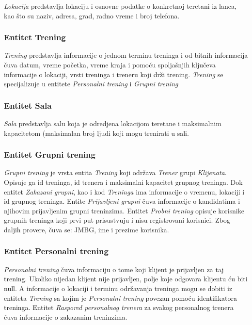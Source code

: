 \documentclass[../main.tex]{subfiles}
\begin{document}
\textit{Lokacija} predstavlja lokaciju i osnovne podatke o konkretnoj teretani iz lanca, kao što su naziv, adresa, grad, radno vreme i broj telefona.


\subsubsection{Entitet Trening}

\textit{Trening} predstavlja informacije o jednom terminu treninga i od bitnih informacija čuva datum, vreme početka, vreme kraja i pomoću spoljašnjih ključeva informacije o lokaciji, vrsti treninga i treneru koji drži trening. \textit{Trening} se specijalizuje u entitete \textit{Personalni trening} i \textit{Grupni trening}


\subsubsection{Entitet Sala}

\textit{Sala} predstavlja salu koja je odredjena lokacijom teretane i maksimalnim kapacitetom (maksimalan broj ljudi koji mogu trenirati u sali.


\subsubsection{Entitet Grupni trening}

\textit{Grupni trening} je vrsta entita \textit{Trening} koji održava \textit{Trener} grupi \textit{Klijenata}. Opisuje ga id treninga, id trenera i maksimalni kapacitet grupnog treninga. Dok entitet \textit{Zakazani grupni}, kao i kod \textit{Treninga} ima informacije o vremenu, lokaciji i id grupnog treninga.
Entite \textit{Prijavljeni grupni} čuva informacije o kandidatima i njihovim prijavljenim grupni treninzima.
Entitet \textit{Probni trening} opisuje korisnike grupnih treninga koji prvi put prisustvuju i nisu registrovani korisnici. Zbog daljih provere, čuva se: JMBG, ime i prezime korisnika.

\subsubsection{Entitet Personalni trening}

\textit{Personalni trening} čuva informaciju o tome koji klijent je prijavljen za taj trening. Ukoliko nijedan klijent nije prijavljen, polje koje odgovara klijentu ću biti null. A informacije o lokaciji i terminu održavanja treninga mogu se dobiti iz entiteta \textit{Trening} sa kojim je \textit{Personalni trening} povezan pomoću identifikatora treninga. Entitet \textit{Raspored personalnog trenera} za svakog personalnog trenera čuva informacije o zakazanim treninzima.
\end{document}
